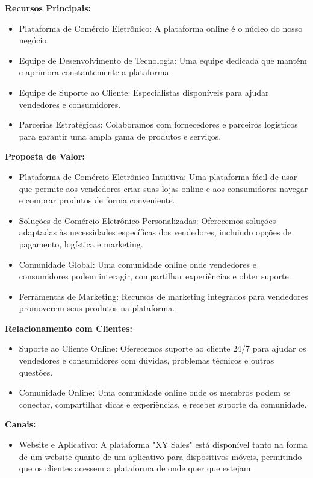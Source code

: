 \documentclass[
	12pt,				%
	openright,			%
	twoside,			%
	a4paper,			%
	english,			%
	brazil				%
	]{abntex2}
\begin{document}
\textbf{Recursos Principais:}
\begin{itemize}
    \item Plataforma de Comércio Eletrônico: A plataforma online é o núcleo do nosso negócio.
    \item Equipe de Desenvolvimento de Tecnologia: Uma equipe dedicada que mantém e aprimora constantemente a plataforma.
    \item Equipe de Suporte ao Cliente: Especialistas disponíveis para ajudar vendedores e consumidores.
    \item Parcerias Estratégicas: Colaboramos com fornecedores e parceiros logísticos para garantir uma ampla gama de produtos e serviços.
\end{itemize}

\textbf{Proposta de Valor:}
\begin{itemize}
    \item Plataforma de Comércio Eletrônico Intuitiva: Uma plataforma fácil de usar que permite aos vendedores criar suas lojas online e aos consumidores navegar e comprar produtos de forma conveniente.
    \item Soluções de Comércio Eletrônico Personalizadas: Oferecemos soluções adaptadas às necessidades específicas dos vendedores, incluindo opções de pagamento, logística e marketing.
    \item Comunidade Global: Uma comunidade online onde vendedores e consumidores podem interagir, compartilhar experiências e obter suporte.
    \item Ferramentas de Marketing: Recursos de marketing integrados para vendedores promoverem seus produtos na plataforma.
\end{itemize}

\textbf{Relacionamento com Clientes:}
\begin{itemize}
    \item Suporte ao Cliente Online: Oferecemos suporte ao cliente 24/7 para ajudar os vendedores e consumidores com dúvidas, problemas técnicos e outras questões.
    \item Comunidade Online: Uma comunidade online onde os membros podem se conectar, compartilhar dicas e experiências, e receber suporte da comunidade.
\end{itemize}

\textbf{Canais:}
\begin{itemize}
    \item Website e Aplicativo: A plataforma "XY Sales" está disponível tanto na forma de um website quanto de um aplicativo para dispositivos móveis, permitindo que os clientes acessem a plataforma de onde quer que estejam.
\end{itemize}
\end{document}
